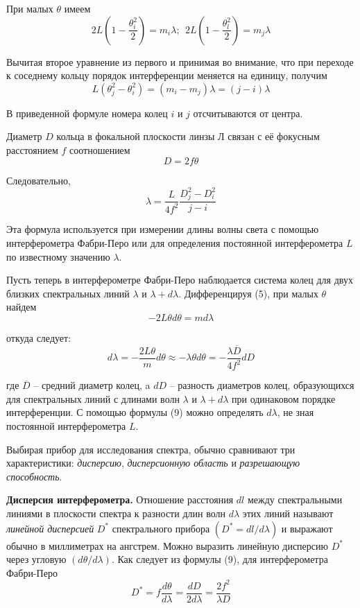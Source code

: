\documentclass[14pt]{article}
\begin{document}
При малых $\theta$ имеем
\begin{equation}
	2L\left(1 - \frac{\theta_i^2}{2}\right) = m_i\lambda;~~2L\left(1 - \frac{\theta_l^2}{2}\right) = m_j\lambda
\end{equation}

\noindent Вычитая второе уравнение из первого и принимая во внимание, что при
переходе к соседнему кольцу порядок интерференции меняется на единицу, получим
$$
	L(\theta_j^2 - \theta_i^2) = (m_i - m_j)\lambda = (j - i)\lambda
$$

\noindent В приведенной формуле номера колец $i$ и $j$ отсчитываются от центра.

Диаметр $D$ кольца в фокальной плоскости линзы Л связан с её фокусным расстоянием
$f$ соотношением
\begin{equation}
	D = 2f\theta
\end{equation}

\noindent Следовательно,
\begin{equation}
	\lambda = \frac{L}{4f^2}\frac{D_j^2 - D_i^2}{j - i}
\end{equation}

\noindent Эта формула используется при измерении длины волны света с помощью
интерферометра Фабри-Перо или для определения постоянной интерферометра
$L$ по известному значению $\lambda$.

Пусть теперь в интерферометре Фабри-Перо наблюдается система колец для двух близких спектральных линий
$\lambda$  и $\lambda + d\lambda$. Дифференцируя (5), при малых $\theta$ найдем
$$
	-2L\theta d\theta = md\lambda
$$

\noindent откуда следует:
\begin{equation}
	d\lambda = -\frac{2L\theta}{m}d\theta \approx -\lambda\theta d\theta = -\frac{\lambda \overline{D}}{4f^2}dD
\end{equation}

\noindent где $\overline{D}$ -- средний диаметр колец, a $dD$ -- разность диаметров колец,
образующихся для спектральных линий с длинами волн $\lambda$ и $\lambda + d\lambda$ при
одинаковом порядке интерференции. С помощью формулы (9) можно определять $d\lambda$, не зная постоянной
интерферометра $L$.

Выбирая прибор для исследования спектра, обычно сравнивают три характеристики: \textsl{дисперсию}, \textsl{дисперсионную область} и
\textsl{разрешающую способность}.

\vspace{0.5cm}
\textbf{Дисперсия интерферометра.} Отношение расстояния $dl$ между спектральными линиями в плоскости спектра
к разности длин волн $d\lambda$ этих линий называют \textsl{линейной дисперсией} $D^*$ спектрального прибора $(D^* = dl/d\lambda)$
и выражают обычно в миллиметрах на ангстрем. Можно выразить линейную дисперсию $D^*$ через угловую $(d\theta/d\lambda)$. Как следует из
формулы (9), для интерферометра Фабри-Перо
$$
	D^* = f\frac{d\theta}{d\lambda} = \frac{dD}{2d\lambda} = \frac{2f^2}{\lambda D}
$$
\end{document}
